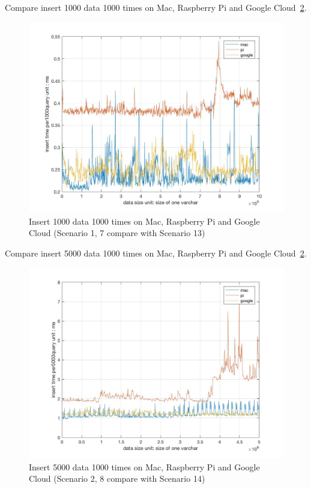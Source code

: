 Compare insert 1000 data 1000 times on Mac, Raspberry Pi and Google Cloud~\ref{f:fly}.

\begin{figure}[!ht]
  \centering\includegraphics[width=\columnwidth]
  {images/insert_comp_1000_three.jpg}
  \caption{Insert 1000 data 1000 times on  Mac, Raspberry Pi and Google Cloud
  (Scenario 1, 7 compare with Scenario 13)}\label{f:fly}
\end{figure}


Compare insert 5000 data 1000 times on Mac, Raspberry Pi and Google Cloud~\ref{f:fly}.

\begin{figure}[!ht]
  \centering\includegraphics[width=\columnwidth]
  {images/insert_comp_5000_three.jpg}
  \caption{Insert 5000 data 1000 times on  Mac, Raspberry Pi and Google Cloud
  (Scenario 2, 8 compare with Scenario 14)}\label{f:fly}
\end{figure}


